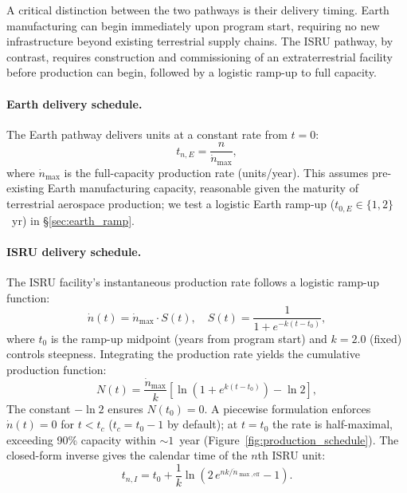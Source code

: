 \documentclass[preprint,12pt]{elsarticle}
\begin{document}
A critical distinction between the two pathways is their delivery timing. Earth manufacturing can begin immediately upon program start, requiring no new infrastructure beyond existing terrestrial supply chains. The ISRU pathway, by contrast, requires construction and commissioning of an extraterrestrial facility before production can begin, followed by a logistic ramp-up to full capacity.

\paragraph{Earth delivery schedule.} The Earth pathway delivers units at a constant rate from $t = 0$:
\begin{equation}
  t_{n,E} = \frac{n}{\dot{n}_{\max}},
  \label{eq:earth_schedule}
\end{equation}
where $\dot{n}_{\max}$ is the full-capacity production rate (units/year). This assumes pre-existing Earth manufacturing capacity, reasonable given the maturity of terrestrial aerospace production; we test a logistic Earth ramp-up ($t_{0,E} \in \{1, 2\}$~yr) in \S\ref{sec:earth_ramp}.

\paragraph{ISRU delivery schedule.} The ISRU facility's instantaneous production rate follows a logistic ramp-up function:
\begin{equation}
  \dot{n}(t) = \dot{n}_{\max} \cdot S(t), \quad S(t) = \frac{1}{1 + e^{-k(t - t_0)}},
  \label{eq:scurve}
\end{equation}
where $t_0$ is the ramp-up midpoint (years from program start) and $k = 2.0$ (fixed) controls steepness. Integrating the production rate yields the cumulative production function:
\begin{equation}
  N(t) = \frac{\dot{n}_{\max}}{k} \left[ \ln\!\left(1 + e^{k(t - t_0)}\right) - \ln 2 \right],
  \label{eq:cumulative_production}
\end{equation}
The constant $-\ln 2$ ensures $N(t_0) = 0$. A piecewise formulation enforces $\dot{n}(t) = 0$ for $t < t_c$ ($t_c = t_0 - 1$ by default); at $t = t_0$ the rate is half-maximal, exceeding 90\% capacity within ${\sim}1$~year (Figure~\ref{fig:production_schedule}). The closed-form inverse gives the calendar time of the $n$th ISRU unit:
\begin{equation}
  t_{n,I} = t_0 + \frac{1}{k} \ln\!\left(2\,e^{nk/\dot{n}_{\max,\mathrm{eff}}} - 1\right).
  \label{eq:production_schedule}
\end{equation}
\end{document}
